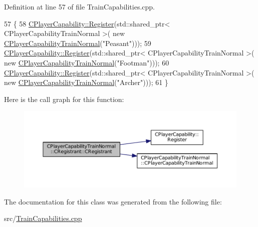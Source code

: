Definition at line 57 of file Train\+Capabilities.\+cpp.


\begin{DoxyCode}
57                                                     \{
58     \hyperlink{classCPlayerCapability_a7e298018dcde2684451add3cfff065f7}{CPlayerCapability::Register}(std::shared\_ptr< CPlayerCapabilityTrainNormal >(\textcolor{keyword}{
      new} \hyperlink{classCPlayerCapabilityTrainNormal_a80b62a5131937c8230bf6229626dc53c}{CPlayerCapabilityTrainNormal}(\textcolor{stringliteral}{"Peasant"})));   
59     \hyperlink{classCPlayerCapability_a7e298018dcde2684451add3cfff065f7}{CPlayerCapability::Register}(std::shared\_ptr< CPlayerCapabilityTrainNormal >(\textcolor{keyword}{
      new} \hyperlink{classCPlayerCapabilityTrainNormal_a80b62a5131937c8230bf6229626dc53c}{CPlayerCapabilityTrainNormal}(\textcolor{stringliteral}{"Footman"})));
60     \hyperlink{classCPlayerCapability_a7e298018dcde2684451add3cfff065f7}{CPlayerCapability::Register}(std::shared\_ptr< CPlayerCapabilityTrainNormal >(\textcolor{keyword}{
      new} \hyperlink{classCPlayerCapabilityTrainNormal_a80b62a5131937c8230bf6229626dc53c}{CPlayerCapabilityTrainNormal}(\textcolor{stringliteral}{"Archer"})));   
61 \}
\end{DoxyCode}
Here is the call graph for this function\+:
\nopagebreak
\begin{figure}[H]
\begin{center}
\leavevmode
\includegraphics[width=350pt]{classCPlayerCapabilityTrainNormal_1_1CRegistrant_a1ff86d5f61a1e9e5e2b9892ac8664848_cgraph}
\end{center}
\end{figure}


The documentation for this class was generated from the following file\+:\begin{DoxyCompactItemize}
\item 
src/\hyperlink{TrainCapabilities_8cpp}{Train\+Capabilities.\+cpp}\end{DoxyCompactItemize}
